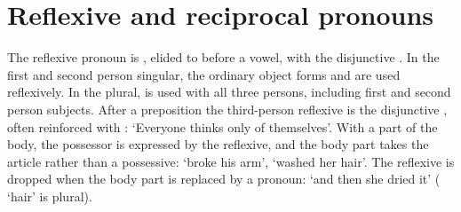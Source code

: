 \section{Reflexive and reciprocal pronouns}\label{sec:reflexive}
The reflexive pronoun is , elided to  before a vowel, with the disjunctive . In the first and second person singular, the ordinary object forms  and  are used reflexively.
In the plural,  is used with all three persons, including first and second person subjects.
After a preposition the third-person reflexive is the disjunctive , often reinforced with :  `Everyone thinks only of themselves'.
With a part of the body, the possessor is expressed by the reflexive, and the body part takes the article rather than a possessive:  `broke his arm',  `washed her hair'. The reflexive is dropped when the body part is replaced by a pronoun:  `and then she dried it' ( `hair' is plural).

